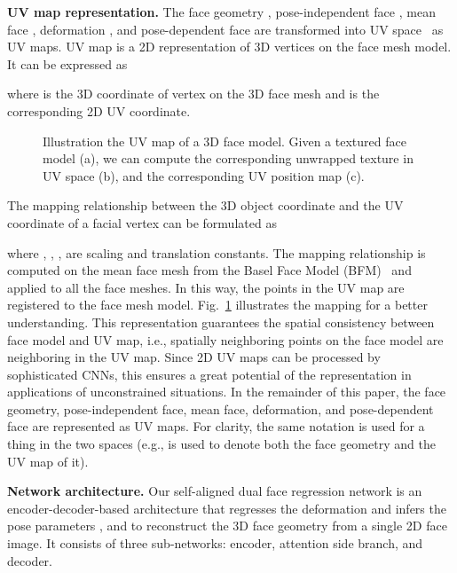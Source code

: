 \documentclass[journal]{IEEEtran}
\begin{document}
	{\bf UV map representation.}
	The face geometry , pose-independent face , mean face , deformation , and pose-dependent face 
	are transformed into UV space~\cite{PRN} as UV maps.
	UV map  is a 2D representation of 3D vertices on the face mesh model.
	It can be expressed as
	
	where  is the 3D coordinate of vertex  on the 3D face mesh and  is the corresponding 2D UV coordinate.
	\begin{figure}[tbp]
		
		\centering
		\hspace{0mm}
		\hspace{-2mm}
		\hspace{-2mm}
		
		\caption{Illustration the UV map of a 3D face model. Given a textured face model (a), we can compute the corresponding unwrapped texture in UV space (b), and the corresponding UV position map (c). }
		\label{fig:new_uv}
	\end{figure}
	
	The mapping relationship between the 3D object coordinate  and the UV coordinate  of a facial vertex  can be formulated as
	
	
	where , , ,  are scaling and translation constants. The mapping relationship is computed on the mean face mesh from the Basel Face Model (BFM)~\cite{BFM2009} and applied to all the face meshes. In this way, the points in the UV map are registered to the face mesh model. Fig.~\ref{fig:new_uv} illustrates the mapping for a better understanding.
	This representation guarantees the spatial consistency between face model and UV map, i.e., spatially neighboring points on the face model are neighboring in the UV map. Since 2D UV maps can be processed by sophisticated CNNs, this ensures a great potential of the representation in applications of unconstrained situations.
	In the remainder of this paper, the face geometry, pose-independent face, mean face, deformation, and pose-dependent face are represented as UV maps.
	For clarity, the same notation is used for a thing in the two spaces (e.g.,  is used to
	denote both the face geometry and the UV map of it).
	
	
	{\bf Network architecture.} Our self-aligned dual face regression network is an encoder-decoder-based architecture that regresses the deformation  and infers the pose parameters ,  and  to reconstruct the 3D face geometry from a single 2D face image.
	It consists of three sub-networks: encoder, attention side branch, and decoder.
	
\end{document}
